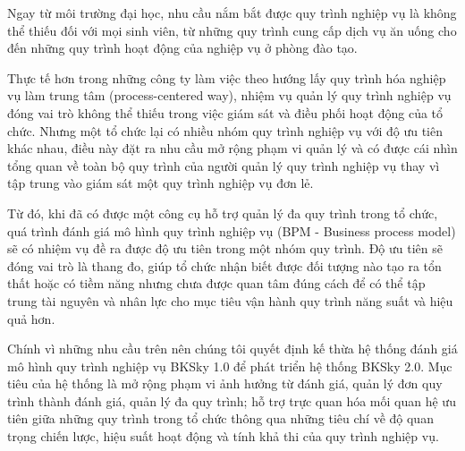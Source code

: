 Ngay từ môi trường đại học, nhu cầu nắm bắt được quy trình nghiệp vụ là không thể thiếu đối với mọi sinh viên, từ những quy trình cung cấp dịch vụ ăn uống cho đến những quy trình hoạt động của nghiệp vụ ở phòng đào tạo. 

Thực tế hơn trong những công ty làm việc theo hướng lấy quy trình hóa nghiệp vụ làm trung tâm (process-centered way), nhiệm vụ quản lý quy trình nghiệp vụ đóng vai trò không thể thiếu trong việc giám sát và điều phối hoạt động của tổ chức. Nhưng một tổ chức lại có nhiều nhóm quy trình nghiệp vụ với độ ưu tiên khác nhau, điều này đặt ra nhu cầu mở rộng phạm vi quản lý và có được cái nhìn tổng quan về toàn bộ quy trình của người quản lý quy trình nghiệp vụ thay vì tập trung vào giám sát một quy trình nghiệp vụ đơn lẻ.

Từ đó, khi đã có được một công cụ hỗ trợ quản lý đa quy trình trong tổ chức, quá trình đánh giá mô hình quy trình nghiệp vụ (BPM - Business process model) sẽ có nhiệm vụ đề ra được độ ưu tiên trong một nhóm quy trình. Độ ưu tiên sẽ đóng vai trò là thang đo, giúp tổ chức nhận biết được đối tượng nào tạo ra tổn thất hoặc có tiềm năng nhưng chưa được quan tâm đúng cách để có thể tập trung tài nguyên và nhân lực cho mục tiêu vận hành quy trình năng suất và hiệu quả hơn.

Chính vì những nhu cầu trên nên chúng tôi quyết định kế thừa hệ thống đánh giá mô hình quy trình nghiệp vụ BKSky 1.0 để phát triển hệ thống BKSky 2.0. Mục tiêu của hệ thống là mở rộng phạm vi ảnh hưởng từ đánh giá, quản lý đơn quy trình thành đánh giá, quản lý đa quy trình; hỗ trợ trực quan hóa mối quan hệ ưu tiên giữa những quy trình trong tổ chức thông qua những tiêu chí về độ quan trọng chiến lược, hiệu suất hoạt động và tính khả thi của quy trình nghiệp vụ.